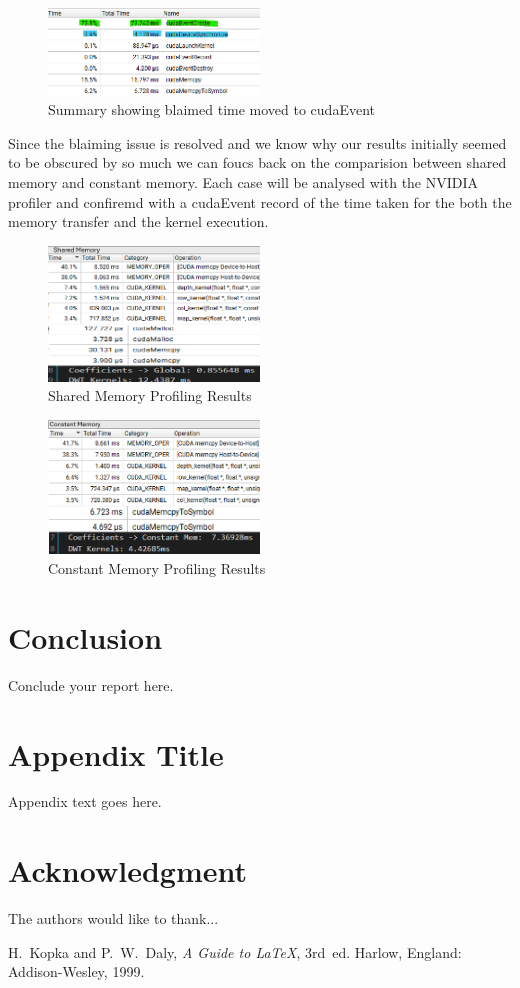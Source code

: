 \documentclass[journal,11pt]{IEEEtran}
\begin{document}
\begin{figure}[h]
    \centering
    \includegraphics[width=0.5\textwidth]{assets/blaimed-event-sum.png}
    \caption{Summary showing blaimed time moved to cudaEvent}
    \label{fig:5}
\end{figure}

Since the blaiming issue is resolved and we know why our results initially seemed to be obscured by so much we can foucs back on the comparision between shared memory and constant memory. Each case will be analysed with the NVIDIA profiler and confiremd with a cudaEvent record of the time taken for the both the memory transfer and the kernel execution.

\begin{figure}[h]
    \centering
    \includegraphics[width=0.5\textwidth]{assets/shared-prof.png}
    \caption{Shared Memory Profiling Results}
    \label{fig:6}
\end{figure}

\begin{figure}[h]
    \centering
    \includegraphics[width=0.5\textwidth]{assets/const-prof.png}
    \caption{Constant Memory Profiling Results}
    \label{fig:7}
\end{figure}

\section{Conclusion}
Conclude your report here.

\appendices
\section{Appendix Title}
Appendix text goes here.

\section*{Acknowledgment}
The authors would like to thank...

\begin{thebibliography}{1}

H.~Kopka and P.~W.~Daly, \emph{A Guide to \LaTeX}, 3rd~ed. Harlow, England: Addison-Wesley, 1999.

\end{thebibliography}
\end{document}
